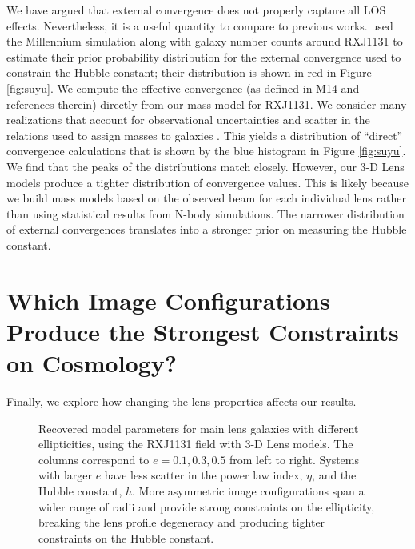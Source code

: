 \documentclass{emulateapj}
\begin{document}
We have argued that external convergence does not properly capture all LOS effects.  Nevertheless, it is a useful quantity to compare to previous works. \citet{Suyu13} used the Millennium simulation along with galaxy number counts around RXJ1131 to estimate their prior probability distribution for the external convergence used to constrain the Hubble constant; their distribution is shown in red in Figure \ref{fig:suyu}. We compute the effective convergence (as defined in M14 and references therein) directly from our mass model for RXJ1131.  We consider many realizations that account for observational uncertainties and scatter in the relations used to assign masses to galaxies \citep[see][]{Wong11}.  This yields a distribution of ``direct'' convergence calculations that is shown by the blue histogram in Figure \ref{fig:suyu}. We find that the peaks of the distributions match closely. However, our 3-D Lens models produce a tighter distribution of convergence values. This is likely because we build mass models based on the observed beam for each individual lens rather than using statistical results from N-body simulations. The narrower distribution of external convergences translates into a stronger prior on measuring the Hubble constant.


\section{Which Image Configurations Produce the Strongest Constraints on Cosmology?}
\label{sec:ImageConfigs}

Finally, we explore how changing the lens properties affects our results.

\begin{figure}[t]
\begin{center}
\caption{\label{fig:ecompare} Recovered model parameters for main lens galaxies with different ellipticities, using the RXJ1131 field with 3-D Lens models. The columns correspond to $e = 0.1,0.3,0.5$ from left to right. Systems with larger $e$ have less scatter in the power law index, $\eta$, and the Hubble constant, $h$. More asymmetric image configurations span a wider range of radii and provide strong constraints on the ellipticity, breaking the lens profile degeneracy and producing tighter constraints on the Hubble constant.%
}
\end{center}
\end{figure}
\end{document}
